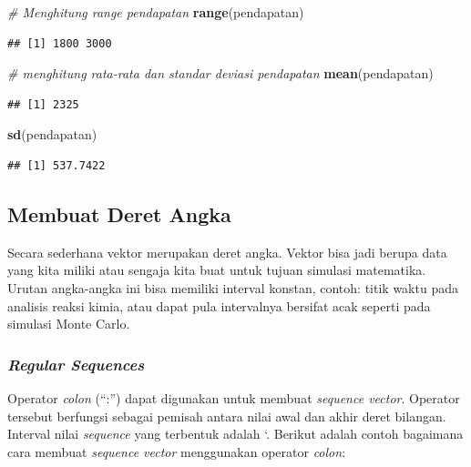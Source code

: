 \documentclass[]{book}
\newenvironment{Shaded}{\begin{snugshade}}{\end{snugshade}}
\newcommand{\CommentTok}[1]{\textcolor[rgb]{0.56,0.35,0.01}{\textit{#1}}}
\newcommand{\KeywordTok}[1]{\textcolor[rgb]{0.13,0.29,0.53}{\textbf{#1}}}
\newcommand{\NormalTok}[1]{#1}
\theoremstyle{definition}
\theoremstyle{definition}
\theoremstyle{definition}
\theoremstyle{remark}
\begin{document}
\begin{Shaded}
\begin{Highlighting}[]
\CommentTok{# Menghitung range pendapatan}
\KeywordTok{range}\NormalTok{(pendapatan)}
\end{Highlighting}
\end{Shaded}

\begin{verbatim}
## [1] 1800 3000
\end{verbatim}

\begin{Shaded}
\begin{Highlighting}[]
\CommentTok{# menghitung rata-rata dan standar deviasi pendapatan}
\KeywordTok{mean}\NormalTok{(pendapatan)}
\end{Highlighting}
\end{Shaded}

\begin{verbatim}
## [1] 2325
\end{verbatim}

\begin{Shaded}
\begin{Highlighting}[]
\KeywordTok{sd}\NormalTok{(pendapatan)}
\end{Highlighting}
\end{Shaded}

\begin{verbatim}
## [1] 537.7422
\end{verbatim}

\hypertarget{seq}{%
\subsection{Membuat Deret Angka}\label{seq}}

Secara sederhana vektor merupakan deret angka. Vektor bisa jadi berupa data yang kita miliki atau sengaja kita buat untuk tujuan simulasi matematika. Urutan angka-angka ini bisa memiliki interval konstan, contoh: titik waktu pada analisis reaksi kimia, atau dapat pula intervalnya bersifat acak seperti pada simulasi Monte Carlo.

\hypertarget{regseq}{%
\subsubsection{\texorpdfstring{\emph{Regular Sequences}}{Regular Sequences}}\label{regseq}}

Operator \emph{colon} (``:'') dapat digunakan untuk membuat \emph{sequence vector}. Operator tersebut berfungsi sebagai pemisah antara nilai awal dan akhir deret bilangan. Interval nilai \emph{sequence} yang terbentuk adalah `. Berikut adalah contoh bagaimana cara membuat \emph{sequence vector} menggunakan operator \emph{colon}:
\end{document}
